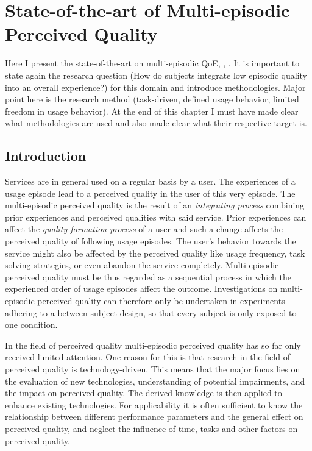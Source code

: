 \chapter{State-of-the-art of Multi-episodic Perceived Quality}\label{chap:05}
\begin{chapter-abstract}
Here I present the state-of-the-art on multi-episodic QoE\cite{moller_single-call_2011}, \cite{duncanson_average_1969}, \cite{guse_macro-temporal_2013}.
It is important to state again the research question (How do subjects integrate low episodic quality into an overall experience?) for this domain and introduce methodologies.
Major point here is the research method (task-driven, defined usage behavior, limited freedom in usage behavior).
At the end of this chapter I must have made clear what methodologies are used and also made clear what their respective target is.
\end{chapter-abstract}


\section{Introduction}
Services are in general used on a regular basis by a user.
The experiences of a usage episode lead to a perceived quality in the user of this very episode. %
The multi-episodic perceived quality is the result of an \emph{integrating process} combining prior experiences and perceived qualities with said service.
Prior experiences can affect the \emph{quality formation process} of a user and such a change affects the perceived quality of following usage episodes.
The user's behavior towards the service might also be affected by the perceived quality like usage frequency, task solving strategies, or even abandon the service completely.
Multi-episodic perceived quality must be thus regarded as a sequential process in which the experienced order of usage episodes affect the outcome. %
Investigations on multi-episodic perceived quality can therefore only be undertaken in experiments adhering to a between-subject design, so that every subject is only exposed to one condition.

In the field of perceived quality multi-episodic perceived quality has so far only received limited attention.
One reason for this is that research in the field of perceived quality is technology-driven.
This means that the major focus lies on the evaluation of new technologies, understanding of potential impairments, and the impact on perceived quality.
The derived knowledge is then applied to enhance existing technologies.
For applicability it is often sufficient to know the relationship between different performance parameters and the general effect on perceived quality, and neglect the influence of time, tasks and other factors on perceived quality.

